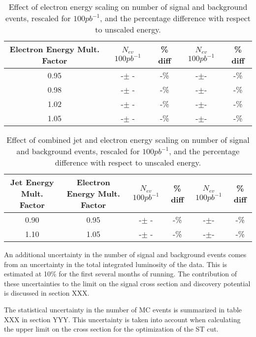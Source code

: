 \begin{table}[htbp]
\begin{center}
\begin{tabular}{|c|c|c|c|c|}
\hline
\hline
Electron Energy Mult. Factor & $N_{ev}$ $100pb^{-1}$ & \% diff & $N_{ev}$ $100pb^{-1}$ & \% diff  \\
\hline
\hline
0.95 & -$\pm$ -& -\% &-$\pm$-& -\% \\
\hline
0.98 & -$\pm$ -& -\% &-$\pm$-& -\% \\
\hline
1.02 & -$\pm$ -& -\% &-$\pm$-&-\% \\
\hline
1.05 & -$\pm$ -& -\% &-$\pm$-& -\% \\
\hline

\hline
\end{tabular}
\end{center}
\caption{Effect of electron energy scaling on number of signal and background events, rescaled for $100 pb^{-1}$, and the percentage difference with respect to unscaled energy.}
\label{tab:ElecUncertainty}
\end{table}

\begin{table}[htbp]
\begin{center}
\begin{tabular}{|c|c|c|c|c|c|}
\hline
\hline
Jet Energy Mult. Factor & Electron Energy Mult. Factor & $N_{ev}$ $100pb^{-1}$ & \% diff & $N_{ev}$ $100pb^{-1}$ & \% diff  \\
\hline
\hline
0.90 & 0.95 & -$\pm$ -& -\% &-$\pm$-& -\% \\
\hline
1.10 & 1.05 & -$\pm$ -& -\% &-$\pm$-& -\% \\
\hline

\hline
\end{tabular}
\end{center}
\caption{Effect of combined jet and electron energy scaling on number of signal and background events, rescaled for $100 pb^{-1}$, and the percentage difference with respect to unscaled energy.}
\label{tab:JetElecUncertainty}
\end{table}


An additional uncertainty in the number of signal and background events comes from an uncertainty in the total integrated luminosity of the data.  
This is estimated at 10\% for the first several months of running.
The contribution of these uncertainties to the limit on the signal cross section and discovery potential is discussed in section XXX.

The statistical uncertainty in the number of MC events is summarized in table XXX in section YYY.  This uncertainty is taken into account when calculating the upper 
limit on the cross section for the optimization of the ST cut.

